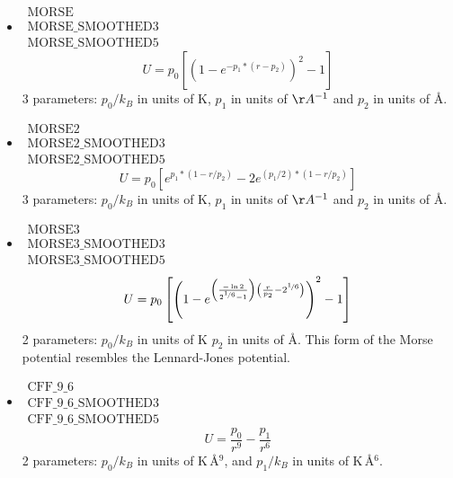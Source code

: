 \begin{itemize}
\item{$\begin{array}{l}\text{MORSE}\\
      \text{MORSE\_SMOOTHED3}\\
      \text{MORSE\_SMOOTHED5}\end{array}$}\\
  \begin{equation}
    U= p_0 \left[(1-{e^{-p_1*(r-p_2)}})^2-1\right]
  \end{equation}
   3 parameters: $p_0/k_B$ in units of K, $p_1$ in units of $\AA^{-1}$ and $p_2$ in units of \AA.

\item{$\begin{array}{l}\text{MORSE2}\\
      \text{MORSE2\_SMOOTHED3}\\
      \text{MORSE2\_SMOOTHED5}\end{array}$}\\
  \begin{equation}
    U= p_0 \left[e^{p_1*(1-r/p_2)}-2e^{(p_1/2)*(1-r/p_2)}\right]
  \end{equation}
   3 parameters: $p_0/k_B$ in units of K, $p_1$ in units of $\AA^{-1}$ and $p_2$ in units of \AA.

\item{$\begin{array}{l}\text{MORSE3}\\
      \text{MORSE3\_SMOOTHED3}\\
      \text{MORSE3\_SMOOTHED5}\end{array}$}\\
  \begin{equation}
    U= p_0 \left[\left(1-e^{\left(\frac{-\ln{2}}{2^{\nicefrac{1}{6}}-1}\right)\left(\frac{r}{p_2}-2^{\nicefrac{1}{6}}\right)}\right)^2-1\right]
  \end{equation}
   2 parameters: $p_0/k_B$ in units of K $p_2$ in units of \AA. This form of the Morse potential resembles the Lennard-Jones potential.

\item{$\begin{array}{l}\text{CFF\_9\_6}\\
      \text{CFF\_9\_6\_SMOOTHED3}\\
      \text{CFF\_9\_6\_SMOOTHED5}\end{array}$}\\
  \begin{equation}
    U= 
      \frac{p_0}{r^{9}}-\frac{p_1}{r^6}
  \end{equation}
   2 parameters: $p_0/k_B$ in units of K\,\AA$^{9}$, and $p_1/k_B$ in units of K\,\AA$^6$.


\end{itemize}
